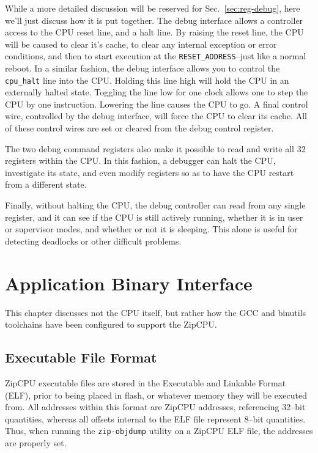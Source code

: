 \documentclass{gqtekspec}
\begin{document}
While a more detailed discussion will be reserved for Sec.~\ref{sec:reg-debug},
here we'll just discuss how it is put together.  The debug interface allows
a controller access to the CPU reset line, and a halt line.  By raising the
reset line, the CPU will be caused to clear it's cache, to clear any internal
exception or error conditions, and then to start execution at the
{\tt RESET\_ADDRESS}--just like a normal reboot.  In a similar fashion, the
debug interface allows you to control the {\tt cpu\_halt} line into the
CPU.  Holding this line high will hold the CPU in an externally halted state.
Toggling the line low for one clock allows one to step the CPU by one 
instruction.  Lowering the line causes the CPU to go.  A final control wire, 
controlled by the debug interface, will force the CPU to clear its cache.
All of these control wires are set or cleared from the debug control register.

The two debug command registers also make it possible to read and write
all 32 registers within the CPU.  In this fashion, a debugger can halt the
CPU, investigate its state, and even modify registers so as to have the
CPU restart from a different state.

Finally, without halting the CPU, the debug controller can read from any
single register, and it can see if the CPU is still actively running, whether
it is in user or supervisor modes, and whether or not it is sleeping.  This
alone is useful for detecting deadlocks or other difficult problems.

\chapter{Application Binary Interface}\label{chap:abi}

This chapter discusses not the CPU itself, but rather how the GCC and binutils
toolchains have been configured to support the ZipCPU.


\section{Executable File Format}\label{sec:abi-elf}
ZipCPU executable files are stored in the Executable and Linkable Format
(ELF), prior to being placed in flash, or whatever memory they will be
executed from.  All addresses within this format are ZipCPU addresses,
referencing 32--bit quantities, whereas all offsets internal to the ELF file
represent 8--bit quantities.  Thus, when running the {\tt zip-objdump} utility
on a ZipCPU ELF file, the addresses are properly set.
\end{document}

